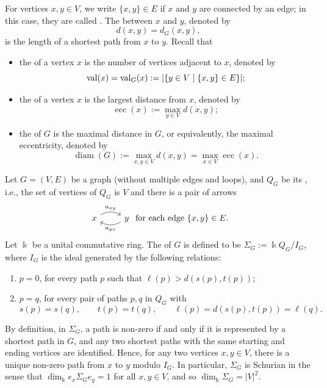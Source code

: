 \documentclass[a4paper,leqno]{amsart}
\begin{document}
For vertices $x,y\in V$, we write $\{x,y\}\in E$ if $x$ and $y$ are connected by an edge; in this case, they are called . The  between $x$ and $y$, denoted by $$d(x,y)=d_G(x,y),$$ is the length of a shortest path from $x$ to $y$. Recall that 
\begin{itemize}
    \item the  of a vertex $x$ is the number of vertices adjacent to $x$, denoted by $$\operatorname{val}(x)=\operatorname{val}_G(x):=|\{y\in V\mid \{x,y\}\in E\}|;$$

    \item the  of a vertex $x$ is the largest distance from $x$, denoted by $$\operatorname{ecc}(x):=\max_{y\in V} d(x,y);$$

    \item the  of $G$ is the maximal distance in $G$, or equivalently, the maximal eccentricity, denoted by $$\operatorname{diam}(G) :=\max_{x,y\in V}d(x,y)=\max_{x\in V}\operatorname{ecc}(x).$$
\end{itemize}

\begin{dfn}\label{def:distance-algebra}
    Let $G=(V,E)$ be a graph (without multiple edges and loops), and $Q_G$ be its , i.e., the set of vertices of $Q_G$ is $V$ and there is a pair of arrows 
\[\begin{tikzcd}
	x \arrow[r, "{a_{xy}}", bend left] & y \arrow[l, "{a_{yx}}", bend left]
\end{tikzcd} \text{ for each edge }\{x,y\}\in E.\]
Let $\Bbbk$ be a unital commutative ring.
The  of $G$ is defined to be
$\Sigma_G:=\Bbbk Q_G/I_G$, where $I_G$ is the ideal generated by the following relations:
\begin{enumerate}
    \item $p=0$, for every path $p$ such that $\ell(p)>d(s(p),t(p))$;
    \item $p=q$, for every pair of paths $p,q$ in $Q_G$ with
$$s(p)=s(q),\qquad t(p)=t(q),\qquad
\ell(p)=d(s(p),t(p))=\ell(q).$$
\end{enumerate}
\end{dfn}

By definition, in $\Sigma_G$, a path is non-zero if and only if it is represented by a shortest path in $G$, and any two shortest paths with the same starting and ending vertices are identified. Hence, for any two vertices $x,y\in V$, there is a unique non-zero path from $x$ to $y$ modulo $I_G$. 
In particular, $\Sigma_G$ is Schurian in the sense that 
$\dim_{\Bbbk} e_x\Sigma_Ge_y=1$ for all $x,y\in V$, and so $\dim_{\Bbbk} \Sigma_G=|V|^2$. 
\end{document}
